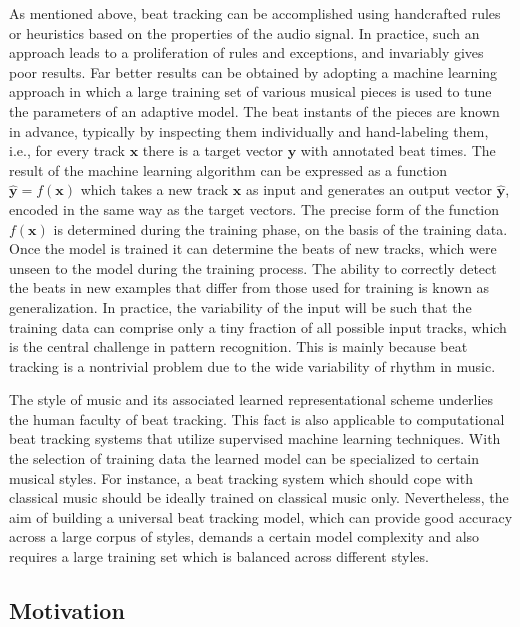 \documentclass{scrartcl}
\begin{document}
As mentioned above, beat tracking can be accomplished using handcrafted rules or heuristics based on the properties of the audio signal. In practice, such an approach leads to a proliferation of rules and exceptions, and invariably gives poor results. Far better results can be obtained by adopting a machine learning approach in which a large training set of various musical pieces is used to tune the parameters of an adaptive model. The beat instants of the pieces are known in advance, typically by inspecting them individually and hand-labeling them, i.e., for every track $\mathbf x$ there is a target vector $\mathbf y$ with annotated beat times. The result of the machine learning algorithm can be expressed as a function $\hat{\mathbf y} = f (\mathbf x)$ which takes a new track $\mathbf x$ as input and generates an output vector $\hat{\mathbf y}$, encoded in the same way as the target vectors. The precise form of the function $f (\mathbf x)$ is determined during the training phase, on the basis of the training data. Once the model is trained it can  determine the beats of new tracks, which were unseen to the model during the training process. The ability to correctly detect the beats in new examples that differ from those used for training is known as generalization. In practice, the variability of the input will be such that the training data can comprise only a tiny fraction of all possible input tracks, which is the central challenge in pattern recognition. This is mainly because beat tracking is a nontrivial problem due to the wide variability of rhythm in music. 

The style of music and its associated learned representational scheme underlies the human faculty of beat tracking. This fact is also applicable to computational beat tracking systems that utilize supervised machine learning techniques. With the selection of  training data the learned model can be specialized to certain musical styles. For instance, a beat tracking system which should cope with classical music should be ideally trained on classical music only. Nevertheless, the aim of building a universal beat tracking model, which can provide good accuracy across a large corpus of styles, demands a certain model complexity and also requires a large training set which is balanced across different styles. 


\subsection{Motivation}
\end{document}
